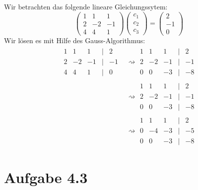 \documentclass{article}
\begin{document}
Wir betrachten das folgende lineare Gleichungssytem:
%
\begin{equation*}
    \left( 
    \begin{array}{ccc}
         1 & 1 & 1 \\
         2 & -2 & -1 \\
         4 & 4 & 1
    \end{array} 
    \right) 
    \left( 
    \begin{array}{c}
         c_1 \\
         c_2 \\
         c_3
    \end{array} 
    \right) 
    = 
    \left( 
    \begin{array}{c}
         2 \\
         -1 \\
         0
    \end{array} 
    \right) 
\end{equation*}
%
Wir lösen es mit Hilfe des Gauss-Algorithmus:
%
\begin{align*}
    \begin{array}{ccccc}
         1 & 1 & 1 & | & 2 \\
         2 & -2 & -1 & | & -1 \\
         4 & 4 & 1 & | & 0 
    \end{array}
    & \rightsquigarrow
    \begin{array}{ccccc}
         1 & 1 & 1 & | & 2 \\
         2 & -2 & -1 & | & -1 \\
         0 & 0 & -3 & | & -8 
    \end{array} \\
    & \rightsquigarrow
    \begin{array}{ccccc}
         1 & 1 & 1 & | & 2 \\
         2 & -2 & -1 & | & -1 \\
         0 & 0 & -3 & | & -8 
    \end{array} \\
    & \rightsquigarrow
    \begin{array}{ccccc}
         1 & 1 & 1 & | & 2 \\
         0 & -4 & -3 & | & -5 \\
         0 & 0 & -3 & | & -8 
    \end{array} 
\end{align*}
%

\section{Aufgabe 4.3}
\end{document}
